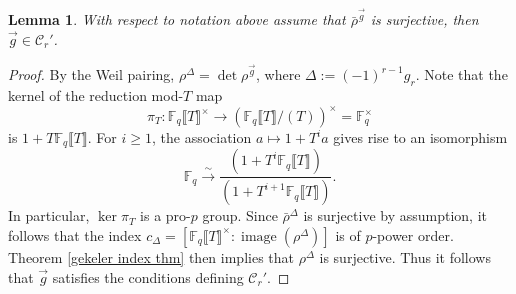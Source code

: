 \documentclass[11pt]{amsart}
\newtheorem{lemma}[theorem]{Lemma}
\newcommand{\F}{\mathbb{F}}
\newcommand{\cC}{\mathcal{C}}
\newcommand{\op}[1]{\operatorname{#1}}
\numberwithin{equation}{section}
\begin{document}
\begin{lemma}\label{detsurjlemma}
    With respect to notation above assume that $\bar{\rho}^{\vec{g}}$ is surjective, then $\vec{g}\in \cC_r'$.
\end{lemma}
\begin{proof}
    By the Weil pairing, $\rho^{\Delta}=\op{det} \rho^{\vec{g}}$, where $\Delta:=(-1)^{r-1} g_r$. Note that the kernel of the reduction mod-$T$ map 
    \[\pi_T:\F_q\llbracket T\rrbracket^\times\rightarrow \left(\F_q\llbracket T\rrbracket/(T)\right)^\times=\F_q^\times\] is $1+T \F_q\llbracket T\rrbracket$. For $i\geq 1$, the association $a\mapsto 1+T^i a$ gives rise to an isomorphism 
    \[\F_q\xrightarrow{\sim} \frac{(1+T^i\F_q\llbracket T \rrbracket)}{(1+T^{i+1}\F_q\llbracket T \rrbracket)}.\] In particular, $\op{ker}\pi_T$ is a pro-$p$ group. Since $\bar{\rho}^{\Delta}$ is surjective by assumption, it follows that the index $c_\Delta=\left[\F_q\llbracket T\rrbracket^\times: \op{image}(\rho^\Delta)\right]$ is of $p$-power order. Theorem \ref{gekeler index thm} then implies that $\rho^{\Delta}$ is surjective. Thus it follows that $\vec{g}$ satisfies the conditions defining $\cC_r'$.
\end{proof}
\end{document}
